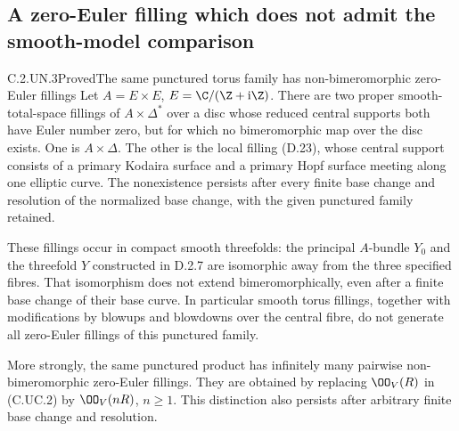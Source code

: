 \subsection{A zero-Euler filling which does not admit the smooth-model comparison}

\begin{statement}{C.2.UN.3}{Proved}{The same punctured torus family has non-bimeromorphic zero-Euler fillings}
Let $A=E\times E$, $E=\C/(\Z+\mathrm i\Z)$.
There are two proper smooth-total-space fillings of
$A\times\Delta^*$ over a disc whose reduced central
supports both have Euler number zero, but for which
no bimeromorphic map over the disc exists. One is
$A\times\Delta$. The other is the local filling
(D.23), whose central support consists of a primary
Kodaira surface and a primary Hopf surface meeting
along one elliptic curve. The nonexistence persists
after every finite base change and resolution of the
normalized base change, with the given punctured
family retained.

These fillings occur in compact smooth threefolds:
the principal $A$-bundle $Y_0$ and the threefold $Y$
constructed in D.2.7 are isomorphic away from the
three specified fibres. That isomorphism does not
extend bimeromorphically, even after a finite base
change of their base curve. In particular smooth
torus fillings, together with modifications by
blowups and blowdowns over the central fibre, do
not generate all zero-Euler fillings of this
punctured family.

More strongly, the same punctured product has
infinitely many pairwise non-bimeromorphic
zero-Euler fillings. They are obtained by replacing
$\OO_V(R)$ in (C.UC.2) by $\OO_V(nR)$,
$n\ge1$. This distinction also persists after
arbitrary finite base change and resolution.
\end{statement}
